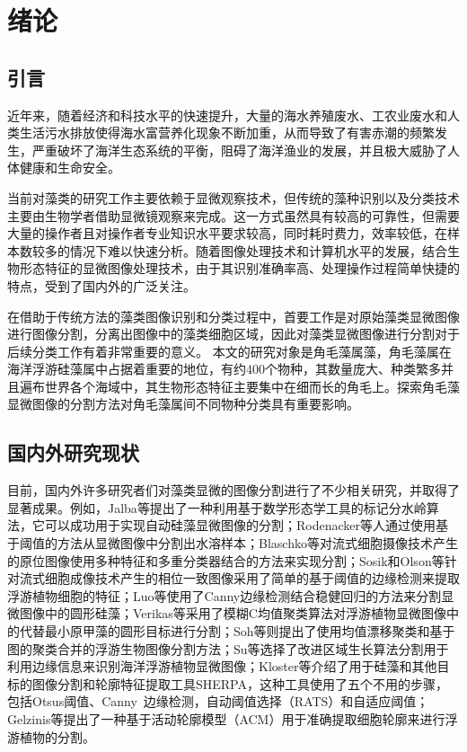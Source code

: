 

\chapter{绪论}
\label{cha1}

\section{引言}
近年来，随着经济和科技水平的快速提升，大量的海水养殖废水、工农业废水和人类生活污水排放使得海水富营养化现象不断加重，从而导致了有害赤潮的频繁发生，严重破坏了海洋生态系统的平衡，阻碍了海洋渔业的发展，并且极大威胁了人体健康和生命安全。

当前对藻类的研究工作主要依赖于显微观察技术，但传统的藻种识别以及分类技术主要由生物学者借助显微镜观察来完成。这一方式虽然具有较高的可靠性，但需要大量的操作者且对操作者专业知识水平要求较高，同时耗时费力，效率较低，在样本数较多的情况下难以快速分析。随着图像处理技术和计算机水平的发展，结合生物形态特征的显微图像处理技术，由于其识别准确率高、处理操作过程简单快捷的特点，受到了国内外的广泛关注。

在借助于传统方法的藻类图像识别和分类过程中，首要工作是对原始藻类显微图像进行图像分割，分离出图像中的藻类细胞区域，因此对藻类显微图像进行分割对于后续分类工作有着非常重要的意义。
本文的研究对象是角毛藻属藻，角毛藻属在海洋浮游硅藻属中占据着重要的地位，有约400个物种，其数量庞大、种类繁多并且遍布世界各个海域中，其生物形态特征主要集中在细而长的角毛上。探索角毛藻显微图像的分割方法对角毛藻属间不同物种分类具有重要影响。

\section{国内外研究现状}
目前，国内外许多研究者们对藻类显微的图像分割进行了不少相关研究，并取得了显著成果。例如，Jalba\cite{jalba2003automatic}\cite{jalba2004automatic}等提出了一种利用基于数学形态学工具的标记分水岭算法，它可以成功用于实现自动硅藻显微图像的分割；Rodenacker\cite{rodenacker2006automatic}等人通过使用基于阈值的方法从显微图像中分割出水溶样本；Blaschko\cite{blaschko2005automatic}等对流式细胞摄像技术产生的原位图像使用多种特征和多重分类器结合的方法来实现分割；Sosik和Olson\cite{sosik2007automated}等针对流式细胞成像技术产生的相位一致图像采用了简单的基于阈值的边缘检测来提取浮游植物细胞的特征；Luo\cite{luo2011automatic}等使用了Canny边缘检测结合稳健回归的方法来分割显微图像中的圆形硅藻；Verikas\cite{verikas2012phase}等采用了模糊C均值聚类算法对浮游植物显微图像中的代替最小原甲藻的圆形目标进行分割；Soh\cite{soh2008segmentation}等则提出了使用均值漂移聚类和基于图的聚类合并的浮游生物图像分割方法；Su\cite{cuiping2010system}等选择了改进区域生长算法分割用于利用边缘信息来识别海洋浮游植物显微图像；Kloster\cite{kloster2014sherpa}等介绍了用于硅藻和其他目标的图像分割和轮廓特征提取工具SHERPA，这种工具使用了五个不用的步骤，包括Otsus阈值、Canny 边缘检测，自动阈值选择（RATS）和自适应阈值；Gelzinis\cite{gelzinis2015novel}等提出了一种基于活动轮廓模型（ACM）用于准确提取细胞轮廓来进行浮游植物的分割。
